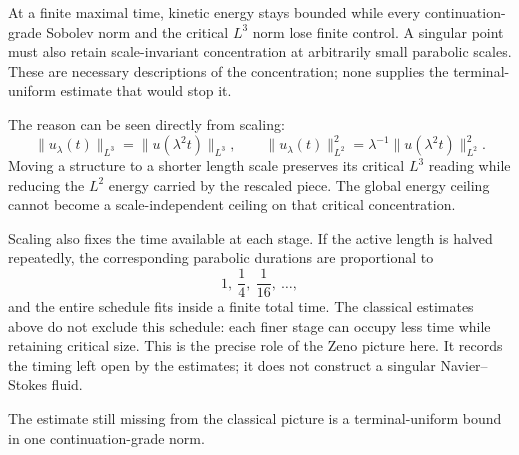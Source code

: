 
At a finite maximal time, kinetic energy stays bounded while every continuation-grade Sobolev norm and the critical \(L^3\) norm lose finite control.
A singular point must also retain scale-invariant concentration at arbitrarily small parabolic scales.
These are necessary descriptions of the concentration; none supplies the terminal-uniform estimate that would stop it.

The reason can be seen directly from scaling:
\[
  \lVert u_\lambda(t)\rVert_{L^3}
  =
  \lVert u(\lambda^2t)\rVert_{L^3},
  \qquad
  \lVert u_\lambda(t)\rVert_{L^2}^2
  =
  \lambda^{-1}
  \lVert u(\lambda^2t)\rVert_{L^2}^2.
\]
Moving a structure to a shorter length scale preserves its critical \(L^3\) reading while reducing the \(L^2\) energy carried by the rescaled piece.
The global energy ceiling cannot become a scale-independent ceiling on that critical concentration.

Scaling also fixes the time available at each stage.
If the active length is halved repeatedly, the corresponding parabolic durations are proportional to
\[
  1,\ \frac14,\ \frac1{16},\ \ldots,
\]
and the entire schedule fits inside a finite total time.
The classical estimates above do not exclude this schedule: each finer stage can occupy less time while retaining critical size.
This is the precise role of the Zeno picture here.
It records the timing left open by the estimates; it does not construct a singular Navier--Stokes fluid.

The estimate still missing from the classical picture is a terminal-uniform bound in one continuation-grade norm.
